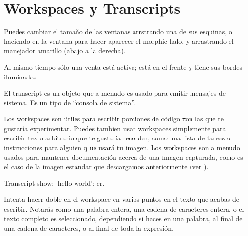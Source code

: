 \documentclass[a4paper,10pt,twoside]{book}
\begin{document}
\section{Workspaces y Transcripts}


Puedes cambiar el tama\~no de las ventanas arrstrando una de sus esquinas, o haciendo \metaclick en la ventana para hacer aparecer el morphic halo, y arrastrando el manejador amarillo (abajo a la derecha).

Al mismo tiempo s\'olo una venta est\'a activa; est\'a en el frente y tiene sus bordes iluminados.

El transcript es un objeto que a menudo es usado para emitir mensajes de sistema.
Es un tipo de ``consola de sistema''.

Los workspaces son \'utiles para escribir porciones de c\'odigo \st con las que te gustar\'ia experimentar.
Puedes tambien usar workspaces simplemente para escribir texto arbitrario que te gustar\'ia recordar, como una lista de tareas o instrucciones para alguien q ue usar\'a tu imagen.
Los workspaces son a menudo usados para mantener documentaci\'on acerca de una imagen capturada, como es el caso de la imagen estandar que descargamos anteriormente (ver ).

\begin{code}{}
Transcript show: 'hello world'; cr.
\end{code}

Intenta hacer doble-\click en el workspace en varios puntos en el texto que acabas de escribir.
Notar\'as como una palabra entera, una cadena de caracteres entera, o el texto completo es seleccionado, dependiendo si haces \click en una palabra, al final de una cadena de caracteres, o al final de toda la expresi\'on.
\end{document}
